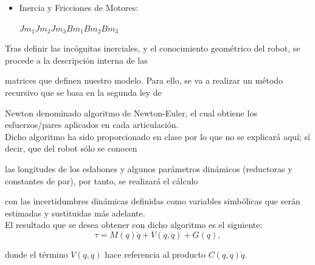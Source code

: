\begin{itemize}
\begin{center}
	\end{center}
	
	\item Inercia y Fricciones de Motores:
	
	\begin{center}
		
		$Jm_1$\hspace{0.2cm}$ Jm_2 $\hspace{0.2cm}$Jm_3$\hspace{0.2cm}$ Bm_1$\hspace{0.2cm}$ Bm_2$\hspace{0.2cm}$ Bm_3$
		
	\end{center}
	
\end{itemize}



\newpage



Tras definir las incógnitas inerciales, y el conocimiento geométrico del robot, se procede a la descripción interna de las

matrices que definen nuestro modelo. Para ello, se va a realizar un método recursivo que se basa en la segunda ley de

Newton denominado algoritmo de Newton-Euler, el cual obtiene los esfuerzos/pares aplicados en cada articulación.\\

Dicho algoritmo ha sido proporcionado en clase por lo que no se explicará aquí; sí decir, que del robot sólo se conocen

las longitudes de los eslabones y algunos parámetros dinámicos (reductoras y constantes de par), por tanto, se realizará el cálculo

con las incertidumbres dinámicas definidas como variables simbólicas que serán estimadas y sustituidas más adelante.\\



El resultado que se desea obtener con dicho algoritmo es el siguiente:\\

\begin{equation}
\tau=M(q)\ddot{q}+V(q,\dot{q})+G(q),
\end{equation}

donde el término $V(q,\dot{q})$ hace referencia al producto $C(q,\dot{q})\dot{q}$.\\



